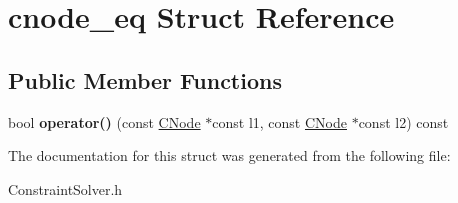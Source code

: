 \hypertarget{structcnode__eq}{\section{cnode\-\_\-eq \-Struct \-Reference}
\label{structcnode__eq}
}
\subsection*{\-Public \-Member \-Functions}
\begin{DoxyCompactItemize}
\item 
\hypertarget{structcnode__eq_a03fed13e2153bd44bdece94dad0b14f5}{bool {\bfseries operator()} (const \hyperlink{classCNode}{\-C\-Node} $\ast$const l1, const \hyperlink{classCNode}{\-C\-Node} $\ast$const l2) const }\label{structcnode__eq_a03fed13e2153bd44bdece94dad0b14f5}

\end{DoxyCompactItemize}


\-The documentation for this struct was generated from the following file\-:\begin{DoxyCompactItemize}
\item 
\-Constraint\-Solver.\-h\end{DoxyCompactItemize}
